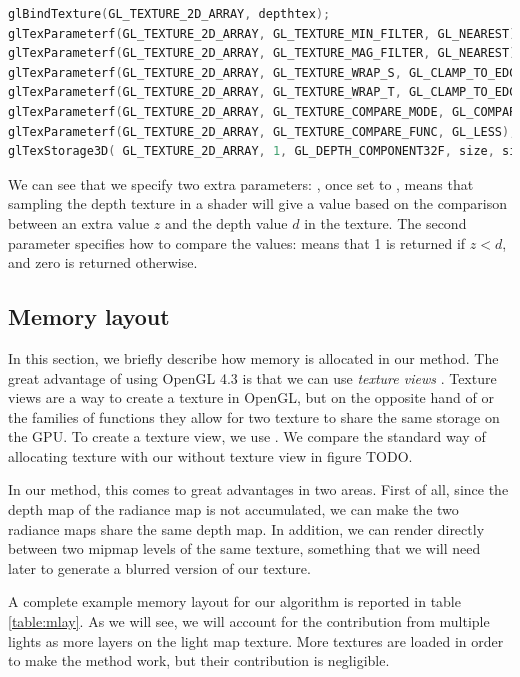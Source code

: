\begin{lstlisting}[language=C++,label=lst:textureconfshadow,caption={Configuration of a shadow map depth texture.}]
glBindTexture(GL_TEXTURE_2D_ARRAY, depthtex);
glTexParameterf(GL_TEXTURE_2D_ARRAY, GL_TEXTURE_MIN_FILTER, GL_NEAREST);
glTexParameterf(GL_TEXTURE_2D_ARRAY, GL_TEXTURE_MAG_FILTER, GL_NEAREST);
glTexParameterf(GL_TEXTURE_2D_ARRAY, GL_TEXTURE_WRAP_S, GL_CLAMP_TO_EDGE);
glTexParameterf(GL_TEXTURE_2D_ARRAY, GL_TEXTURE_WRAP_T, GL_CLAMP_TO_EDGE);
glTexParameterf(GL_TEXTURE_2D_ARRAY, GL_TEXTURE_COMPARE_MODE, GL_COMPARE_REF_TO_TEXTURE);
glTexParameterf(GL_TEXTURE_2D_ARRAY, GL_TEXTURE_COMPARE_FUNC, GL_LESS);
glTexStorage3D(	GL_TEXTURE_2D_ARRAY, 1, GL_DEPTH_COMPONENT32F, size, size, layers);
\end{lstlisting}

We can see that we specify two extra parameters: , once set to , means that sampling the depth texture in a shader will give a value based on the comparison between an extra value $z$ and the depth value $d$ in the texture. The second parameter  specifies how to compare the values:  means that 1 is returned if $z<d$, and zero is returned otherwise. 

\subsection{Memory layout}
\label{sec:memorylayout}

In this section, we briefly describe how memory is allocated in our method. The great advantage of using OpenGL 4.3 is that we can use \emph{texture views} \citep{openglspec}. Texture views are a way to create a texture in OpenGL, but on the opposite hand of  or the  families of functions they allow for two texture to share the same storage on the GPU. To create a texture view, we use . We compare the standard way of allocating texture with our without texture view in figure TODO.

In our method, this comes to great advantages in two areas. First of all, since the depth map of the radiance map is not accumulated, we can make the two radiance maps share the same depth map. In addition, we can render directly between two mipmap levels of the same texture, something that we will need later to generate a blurred version of our texture.

A complete example memory layout for our algorithm is reported in table \ref{table:mlay}. As we will see, we will account for the contribution from multiple lights as more layers on the light map texture. More textures are loaded in order to make the method work, but their contribution is negligible.

